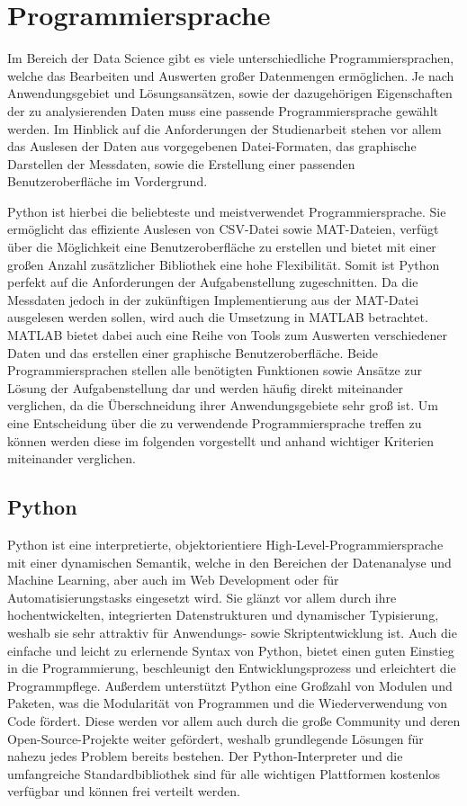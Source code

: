 \section{Programmiersprache}

Im Bereich der Data Science gibt es viele unterschiedliche Programmiersprachen, welche das Bearbeiten und Auswerten großer Datenmengen ermöglichen. Je nach Anwendungsgebiet und Lösungsansätzen, sowie der dazugehörigen Eigenschaften der zu analysierenden Daten muss eine passende Programmiersprache gewählt werden. Im Hinblick auf die Anforderungen der Studienarbeit stehen vor allem das Auslesen der Daten aus vorgegebenen Datei-Formaten, das graphische Darstellen der Messdaten, sowie die Erstellung einer passenden Benutzeroberfläche im Vordergrund. 

Python ist hierbei die beliebteste und meistverwendet Programmiersprache. Sie ermöglicht das effiziente Auslesen von CSV-Datei sowie MAT-Dateien, verfügt über die Möglichkeit eine Benutzeroberfläche zu erstellen und bietet mit einer großen Anzahl zusätzlicher Bibliothek eine hohe Flexibilität. Somit ist Python perfekt auf die Anforderungen der Aufgabenstellung zugeschnitten. Da die Messdaten jedoch in der zukünftigen Implementierung aus der MAT-Datei ausgelesen werden sollen, wird auch die Umsetzung in MATLAB betrachtet. MATLAB bietet dabei auch eine Reihe von Tools zum Auswerten verschiedener Daten und das erstellen einer graphische Benutzeroberfläche. Beide Programmiersprachen stellen alle benötigten Funktionen sowie Ansätze zur Lösung der Aufgabenstellung dar und werden häufig direkt miteinander verglichen, da die Überschneidung ihrer Anwendungsgebiete sehr groß ist. Um eine Entscheidung über die zu verwendende Programmiersprache treffen zu können werden diese im folgenden vorgestellt und anhand wichtiger Kriterien miteinander verglichen.

\subsection{Python}

Python ist eine interpretierte, objektorientiere High-Level-Programmiersprache mit einer dynamischen Semantik, welche in den Bereichen der Datenanalyse und Machine Learning, aber auch im Web Development oder für Automatisierungstasks eingesetzt wird. Sie glänzt vor allem durch ihre hochentwickelten, integrierten Datenstrukturen und dynamischer Typisierung, weshalb sie sehr attraktiv für Anwendungs- sowie Skriptentwicklung ist. Auch die einfache und leicht zu erlernende Syntax von Python, bietet einen guten Einstieg in die Programmierung, beschleunigt den Entwicklungsprozess und erleichtert die Programmpflege. Außerdem unterstützt Python eine Großzahl von Modulen und Paketen, was die Modularität von Programmen und die Wiederverwendung von Code fördert. Diese werden vor allem auch durch die große Community und deren Open-Source-Projekte weiter gefördert, weshalb grundlegende Lösungen für nahezu jedes Problem bereits bestehen. Der Python-Interpreter und die umfangreiche Standardbibliothek sind für alle wichtigen Plattformen kostenlos verfügbar und können frei verteilt werden.

